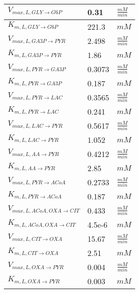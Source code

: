 \begin{supertabular}{lll}
$V_{max, L,GLY \xrightarrow[]{} G6P}$ & 0.31 & $\frac{mM}{min}$       \\ \hline
$K_{m, L,GLY \xrightarrow[]{} G6P}$ & 221.3 & $mM$   \\ \hline

$V_{max, L,GA3P \xrightarrow[]{} PYR}$ & 2.498 & $\frac{mM}{min}$       \\ \hline
$K_{m, L,GA3P \xrightarrow[]{} PYR}$ & 1.86 & $mM$   \\ \hline

$V_{max, L,PYR \xrightarrow[]{} GA3P}$ & 0.3073 & $\frac{mM}{min}$       \\ \hline
$K_{m, L,PYR \xrightarrow[]{} GA3P}$ & 0.187 & $mM$   \\ \hline

$V_{max, L,PYR \xrightarrow[]{} LAC}$ & 0.3565 & $\frac{mM}{min}$       \\ \hline
$K_{m, L,PYR \xrightarrow[]{} LAC}$ & 0.241 & $mM$   \\ \hline

$V_{max, L,LAC \xrightarrow[]{} PYR}$ & 0.5617 & $\frac{mM}{min}$       \\ \hline
$K_{m, L,LAC \xrightarrow[]{} PYR}$ & 1.052 & $mM$   \\ \hline

$V_{max, L,AA \xrightarrow[]{} PYR}$ & 0.4212 & $\frac{mM}{min}$       \\ \hline
$K_{m, L,AA \xrightarrow[]{} PYR}$ & 2.85 & $mM$   \\ \hline

$V_{max, L,PYR \xrightarrow[]{} ACoA}$ & 0.2733 & $\frac{mM}{min}$       \\ \hline
$K_{m, L,PYR \xrightarrow[]{} ACoA}$ & 0.187 & $mM$   \\ \hline

$V_{max, L,ACoA , OXA \xrightarrow[]{} CIT}$ & 0.433 & $\frac{mM}{min}$       \\ \hline
$K_{m, L,ACoA , OXA \xrightarrow[]{} CIT}$ & 4.5e-6 & $mM$   \\ \hline

$V_{max, L,CIT \xrightarrow[]{} OXA}$ & 15.67 & $\frac{mM}{min}$       \\ \hline
$K_{m, L,CIT \xrightarrow[]{} OXA}$ & 2.51 & $mM$   \\ \hline

$V_{max, L,OXA \xrightarrow[]{} PYR}$ & 0.004 & $\frac{mM}{min}$       \\ \hline
$K_{m, L,OXA \xrightarrow[]{} PYR}$ & 0.003 & $mM$   \\ \hline


\end{supertabular}
